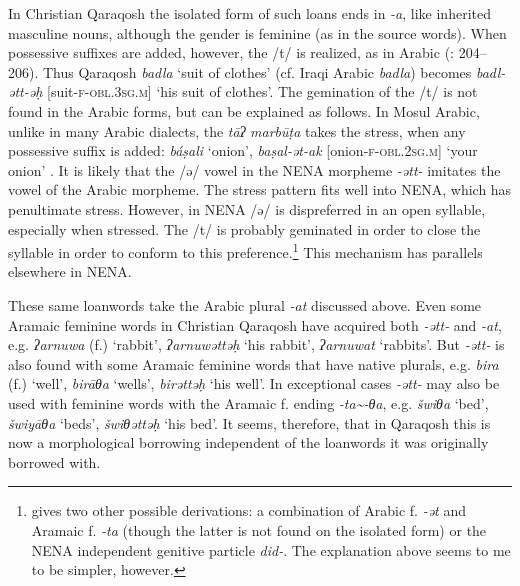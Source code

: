 \documentclass[output=paper]{langsci/langscibook}
\begin{document}
In Christian Qaraqosh the isolated form of such loans ends in \textit{{}-a}, like inherited masculine nouns, although the gender is feminine (as in the source words). When possessive suffixes are added, however, the /t/ is realized, as in Arabic (\citealt{Khan2002}: 204–206). Thus Qaraqosh \textit{badla} ‘suit of clothes’ (cf. Iraqi Arabic \textit{badla}) becomes \textit{badl\nobreakdash-ətt\nobreakdash-əḥ} [suit-\textsc{f-obl.3sg.m]} ‘his suit of clothes’. The gemination of the /t/ is not found in the Arabic forms, but can be explained as follows. In Mosul Arabic, unlike in many Arabic dialects, the \textit{tāʔ} \textit{marbūṭa} takes the stress, when any possessive suffix is added: \textit{báṣali} ‘onion’, \textit{baṣal\nobreakdash-ət\nobreakdash-ak} [onion-\textsc{f-obl.2sg.m}] ‘your onion’ \citep[105]{Jastrow1983}. It is likely that the /ə/ vowel in the NENA morpheme \textit{{}-ətt-} imitates the vowel of the Arabic morpheme. The stress pattern fits well into NENA, which has penultimate stress. However, in NENA /ə/ is dispreferred in an open syllable, especially when stressed. The /t/ is probably geminated in order to close the syllable in order to conform to this preference.\footnote{\citet[206]{Khan2002} gives two other possible derivations: a combination of Arabic f. \textit{\nobreakdash-ət} and Aramaic f. \textit{\nobreakdash-ta} (though the latter is not found on the isolated form) or the NENA independent genitive particle \textit{did-}. The explanation above seems to me to be simpler, however.} This mechanism has parallels elsewhere in NENA.

These same loanwords take the Arabic plural \textit{{}-at} discussed above. Even some Aramaic feminine words in Christian Qaraqosh have acquired both \textit{{}-ətt-} and \textit{\nobreakdash-at}, e.g. \textit{ʔarnuwa} (f.) ‘rabbit’, \textit{ʔarnuwəttəḥ} ‘his rabbit’, \textit{ʔarnuwat} ‘rabbits’. But \textit{{}-ətt-} is also found with some Aramaic feminine words that have native plurals, e.g. \textit{bira} (f.) ‘well’, \textit{birāθa} ‘wells’, \textit{birəttəḥ} ‘his well’. In exceptional cases \textit{{}-ətt-} may also be used with feminine words with the Aramaic f. ending \textit{{}-ta{\textasciitilde}-θa}, e.g. \textit{šwiθa} ‘bed’, \textit{šwiyāθa} ‘beds’, \textit{šwiθəttəḥ} ‘his bed’. It seems, therefore, that in Qaraqosh this is now a morphological borrowing independent of the loanwords it was originally borrowed with.
\end{document}
